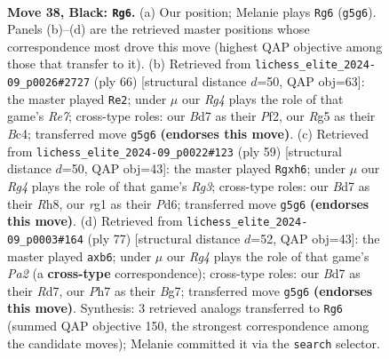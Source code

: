\documentclass[11pt]{article}
\begin{document}
\clearpage

\begin{figure}[p]\centering
\begin{subfigure}{0.46\textwidth}\centering
\resizebox{\linewidth}{!}{%
\newchessgame
\chessboard[
  setfen={3r1k2/3b1p1p/1p6/p2p2r1/P5P1/1P1K1B2/5N1P/2R3R1 b - - 0 38},
  showmover=false,
  pgfstyle=straightmove, color=movearrow, markmove={g5-g6}
]}
\caption{}
\end{subfigure}\hfill
\begin{subfigure}{0.46\textwidth}\centering
\resizebox{\linewidth}{!}{%
\newchessgame
\chessboard[
  setfen={5rk1/4Rp2/2Np2p1/2nP4/2B3P1/1p6/rP3P2/3R2K1 w - - 4 34},
  showmover=false,
  pgfstyle=straightmove, color=movearrow, markmove={e7-e2}
]}
\caption{}
\end{subfigure}
\\[4pt]
\begin{subfigure}{0.46\textwidth}\centering
\resizebox{\linewidth}{!}{%
\newchessgame
\chessboard[
  setfen={7r/p3k3/b2pp1rP/2p5/2P2pPP/1P5K/P4N2/4RR2 b - - 0 30},
  showmover=false,
  pgfstyle=straightmove, color=movearrow, markmove={g6-h6}
]}
\caption{}
\end{subfigure}\hfill
\begin{subfigure}{0.46\textwidth}\centering
\resizebox{\linewidth}{!}{%
\newchessgame
\chessboard[
  setfen={8/p2r1kb1/1Pr3p1/4ppB1/P7/3P2P1/5P2/3RR1K1 b - - 0 39},
  showmover=false,
  pgfstyle=straightmove, color=movearrow, markmove={a7-b6}
]}
\caption{}
\end{subfigure}
\caption{\textbf{Move 38, Black: \texttt{Rg6}.} (a) Our position; Melanie plays \texttt{Rg6} (\texttt{g5g6}). Panels (b)--(d) are the retrieved master positions whose correspondence most drove this move (highest QAP objective among those that transfer to it). (b) Retrieved from \texttt{lichess\_elite\_2024-09\_p0026\#2727} (ply 66) [structural distance $d$=50, QAP obj=63]: the master played \texttt{Re2}; under $\mu$ our \emph{Rg4} plays the role of that game's \emph{Re7}; cross-type roles: our \emph{B}d7 as their \emph{P}f2, our \emph{R}g5 as their \emph{B}c4; transferred move \texttt{g5g6} \textbf{(endorses this move)}. (c) Retrieved from \texttt{lichess\_elite\_2024-09\_p0022\#123} (ply 59) [structural distance $d$=50, QAP obj=43]: the master played \texttt{Rgxh6}; under $\mu$ our \emph{Rg4} plays the role of that game's \emph{Rg3}; cross-type roles: our \emph{B}d7 as their \emph{R}h8, our \emph{r}g1 as their \emph{P}d6; transferred move \texttt{g5g6} \textbf{(endorses this move)}. (d) Retrieved from \texttt{lichess\_elite\_2024-09\_p0003\#164} (ply 77) [structural distance $d$=52, QAP obj=43]: the master played \texttt{axb6}; under $\mu$ our \emph{Rg4} plays the role of that game's \emph{Pa2} (a \textbf{cross-type} correspondence); cross-type roles: our \emph{B}d7 as their \emph{R}d7, our \emph{P}h7 as their \emph{B}g7; transferred move \texttt{g5g6} \textbf{(endorses this move)}. Synthesis: 3 retrieved analogs transferred to \texttt{Rg6} (summed QAP objective 150, the strongest correspondence among the candidate moves); Melanie committed it via the \texttt{search} selector.}
\label{fig:thought-m75}
\end{figure}
\end{document}
